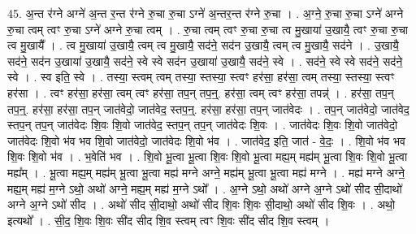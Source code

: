 \documentclass[17pt]{extarticle}
\begin{document}
45. अ॒न्त र॑ग्ने अग्ने॑ अ॒न्त र॒न्त र॑ग्ने रु॒चा रु॒चा ऽग्ने॑ अ॒न्तर॒न्त र॑ग्ने रु॒चा । . अ॒ग्ने॒ रु॒चा रु॒चा ऽग्ने॑ अग्ने रु॒चा त्वम् त्वꣳ रु॒चा ऽग्ने॑ अग्ने रु॒चा त्वम् । . रु॒चा त्वम् त्वꣳ रु॒चा रु॒चा त्व मु॒खाया॑ उ॒खायै॒ त्वꣳ रु॒चा रु॒चा त्व मु॒खायै᳚ । . त्व मु॒खाया॑ उ॒खायै॒ त्वम् त्व मु॒खायै॒ सद॑ने॒ सद॑न उ॒खायै॒ त्वम् त्व मु॒खायै॒ सद॑ने । . उ॒खायै॒ सद॑ने॒ सद॑न उ॒खाया॑ उ॒खायै॒ सद॑ने॒ स्वे स्वे सद॑न उ॒खाया॑ उ॒खायै॒ सद॑ने॒ स्वे । . सद॑ने॒ स्वे स्वे सद॑ने॒ सद॑ने॒ स्वे । . स्व इति॒ स्वे । . तस्या॒ स्त्वम् त्वम् तस्या॒ स्तस्या॒ स्त्वꣳ हर॑सा॒ हर॑सा॒ त्वम् तस्या॒ स्तस्या॒ स्त्वꣳ हर॑सा । . त्वꣳ हर॑सा॒ हर॑सा॒ त्वम् त्वꣳ हर॑सा॒ तप॒न् तप॒न्॒. हर॑सा॒ त्वम् त्वꣳ हर॑सा॒ तपन्न्॑ । . हर॑सा॒ तप॒न् तप॒न्॒. हर॑सा॒ हर॑सा॒ तप॒न् जात॑वेदो॒ जात॑वेद॒ स्तप॒न्॒. हर॑सा॒ हर॑सा॒ तप॒न् जात॑वेदः । . तप॒न् जात॑वेदो॒ जात॑वेद॒ स्तप॒न् तप॒न् जात॑वेदः शि॒वः शि॒वो जात॑वेद॒ स्तप॒न् तप॒न् जात॑वेदः शि॒वः । . जात॑वेदः शि॒वः शि॒वो जात॑वेदो॒ जात॑वेदः शि॒वो भ॑व भव शि॒वो जात॑वेदो॒ जात॑वेदः शि॒वो भ॑व । . जात॑वेद॒ इति॒ जात॑ - वे॒दः॒ । . शि॒वो भ॑व भव शि॒वः शि॒वो भ॑व । . भ॒वेति॑ भव । . शि॒वो भू॒त्वा भू॒त्वा शि॒वः शि॒वो भू॒त्वा मह्य॒म् मह्य॑म् भू॒त्वा शि॒वः शि॒वो भू॒त्वा मह्य᳚म् । . भू॒त्वा मह्य॒म् मह्य॑म् भू॒त्वा भू॒त्वा मह्य॑ मग्ने अग्ने॒ मह्य॑म् भू॒त्वा भू॒त्वा मह्य॑ मग्ने । . मह्य॑ मग्ने अग्ने॒ मह्य॒म् मह्य॑ म॒ग्ने ऽथो॒ अथो॑ अग्ने॒ मह्य॒म् मह्य॑ म॒ग्ने ऽथो᳚ । . अ॒ग्ने ऽथो॒ अथो॑ अग्ने अ॒ग्ने ऽथो॑ सीद सी॒दाथो॑ अग्ने अ॒ग्ने ऽथो॑ सीद । . अथो॑ सीद सी॒दाथो॒ अथो॑ सीद शि॒वः शि॒वः सी॒दाथो॒ अथो॑ सीद शि॒वः । . अथो॒ इत्यथो᳚ । . सी॒द॒ शि॒वः शि॒वः सी॑द सीद शि॒व स्त्वम् त्वꣳ शि॒वः सी॑द सीद शि॒व स्त्वम् । \newline
\end{document}
